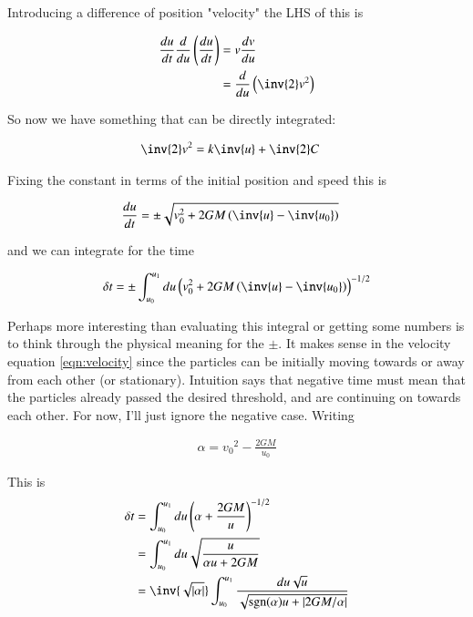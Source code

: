 \documentclass{article}
\DeclareMathOperator{\sgn}{sgn}
\begin{document}
Introducing a difference of position "velocity" the LHS of this is

\begin{align*}
\frac{du}{dt} \frac{d}{du} \left(\frac{du}{dt}\right)
&= v \frac{dv}{du} \\
&= \frac{d}{du} \left( \inv{2}v^2 \right) \\
\end{align*}

So now we have something that can be directly integrated:

\begin{align*}
\inv{2}v^2 &= k \inv{u} + \inv{2}C
\end{align*}

Fixing the constant in terms of the initial position and speed this is

\begin{align}\label{eqn:velocity}
\frac{du}{dt} &= \pm \sqrt{v_0^2 + 2 G M \left(\inv{u} - \inv{u_0}\right)}
\end{align}

and we can integrate for the time

\begin{align*}
\delta t 
&= \pm \int_{u_0}^{u_1} du \left(v_0^2 + 2 G M \left(\inv{u} - \inv{u_0}\right)\right)^{-1/2} \\
\end{align*}

Perhaps more interesting than evaluating this integral or getting some numbers is to think through the physical meaning for the $\pm$.  It makes sense in the velocity equation \ref{eqn:velocity} since the particles can be initially moving towards or away from each other (or stationary).  Intuition says that negative time must mean that the particles already passed the desired threshold, and are continuing on towards each other.  For now, I'll just ignore the negative case.  Writing

\begin{align*}
\alpha = {v_0}^2 - \frac{2GM}{u_0}
\end{align*}

This is
\begin{align*}
\delta t 
&=  \int_{u_0}^{u_1} du \left(\alpha + \frac{2 G M}{u} \right)^{-1/2} \\
&=  \int_{u_0}^{u_1} du \sqrt{\frac{u}{\alpha u + 2 G M}} \\
&=  \inv{\sqrt{\Abs{\alpha}}} \int_{u_0}^{u_1} \frac{du \sqrt{u}}{\sqrt{\sgn(\alpha) u + \Abs{2 G M/\alpha}}}
\end{align*}
\end{document}
